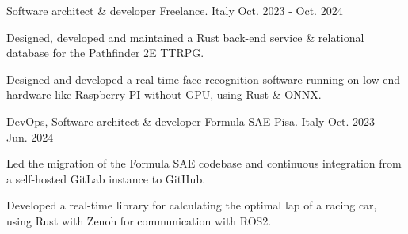 
\begin{cventries}

  \cventry
  {Software architect \& developer} %
  {Freelance.} %
  {Italy} %
  {Oct. 2023 - Oct. 2024} %
  {
    \begin{cvitems} %
    \item {Designed, developed and maintained a Rust back-end service
      \& relational database for the Pathfinder 2E TTRPG.}
    \item {Designed and developed a real-time face recognition
        software running on low end hardware like Raspberry PI without
      GPU, using Rust \& ONNX.}
    \end{cvitems}
  }


  \cventry
  {DevOps, Software architect \& developer} %
  {Formula SAE Pisa.} %
  {Italy} %
  {Oct. 2023 - Jun. 2024} %
  {
    \begin{cvitems} %
    \item {Led the migration of the Formula SAE codebase and
      continuous integration from a self-hosted GitLab instance to GitHub.}
    \item {Developed a real-time library for calculating the optimal
      lap of a racing car, using Rust with Zenoh for communication with ROS2.}
    \end{cvitems}
  }


\end{cventries}
